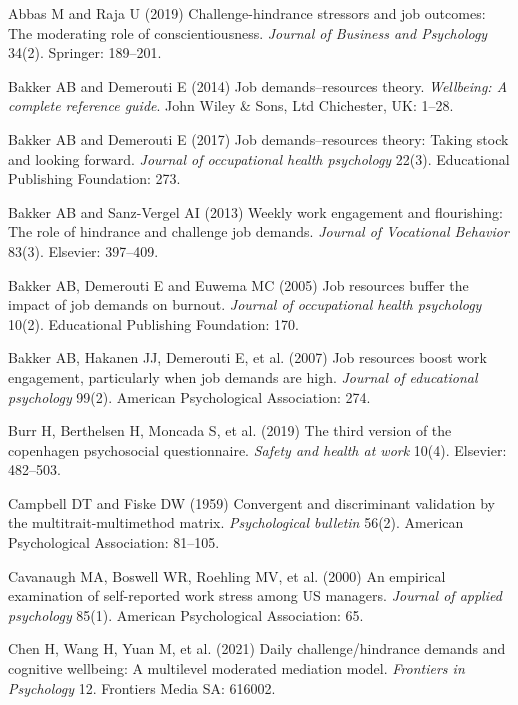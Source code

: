 \documentclass[
  man]{apa7}
\newlength{\cslhangindent}
\newenvironment{CSLReferences}[2] %
 {\begin{list}{}{%
  \setlength{\itemindent}{0pt}
  \setlength{\leftmargin}{0pt}
  \setlength{\parsep}{0pt}
  \ifodd #1
   \setlength{\leftmargin}{\cslhangindent}
   \setlength{\itemindent}{-1\cslhangindent}
  \fi
  \setlength{\itemsep}{#2\baselineskip}}}
 {\end{list}}
\begin{document}
\label{refs}
\begin{CSLReferences}{1}{1}
Abbas M and Raja U (2019) Challenge-hindrance stressors and job outcomes: The moderating role of conscientiousness. \emph{Journal of Business and Psychology} 34(2). Springer: 189--201.

Bakker AB and Demerouti E (2014) Job demands--resources theory. \emph{Wellbeing: A complete reference guide}. John Wiley \& Sons, Ltd Chichester, UK: 1--28.

Bakker AB and Demerouti E (2017) Job demands--resources theory: Taking stock and looking forward. \emph{Journal of occupational health psychology} 22(3). Educational Publishing Foundation: 273.

Bakker AB and Sanz-Vergel AI (2013) Weekly work engagement and flourishing: The role of hindrance and challenge job demands. \emph{Journal of Vocational Behavior} 83(3). Elsevier: 397--409.

Bakker AB, Demerouti E and Euwema MC (2005) Job resources buffer the impact of job demands on burnout. \emph{Journal of occupational health psychology} 10(2). Educational Publishing Foundation: 170.

Bakker AB, Hakanen JJ, Demerouti E, et al. (2007) Job resources boost work engagement, particularly when job demands are high. \emph{Journal of educational psychology} 99(2). American Psychological Association: 274.

Burr H, Berthelsen H, Moncada S, et al. (2019) The third version of the copenhagen psychosocial questionnaire. \emph{Safety and health at work} 10(4). Elsevier: 482--503.

Campbell DT and Fiske DW (1959) Convergent and discriminant validation by the multitrait-multimethod matrix. \emph{Psychological bulletin} 56(2). American Psychological Association: 81--105.

Cavanaugh MA, Boswell WR, Roehling MV, et al. (2000) An empirical examination of self-reported work stress among US managers. \emph{Journal of applied psychology} 85(1). American Psychological Association: 65.

Chen H, Wang H, Yuan M, et al. (2021) Daily challenge/hindrance demands and cognitive wellbeing: A multilevel moderated mediation model. \emph{Frontiers in Psychology} 12. Frontiers Media SA: 616002.


\end{CSLReferences}
\end{document}
